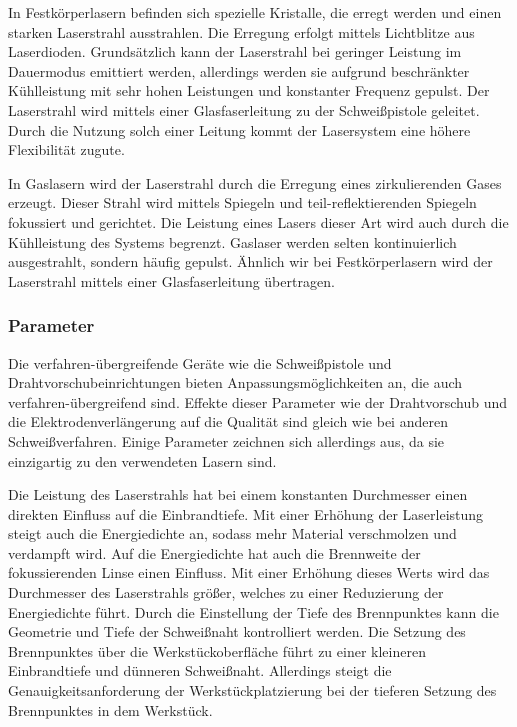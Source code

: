 In Festkörperlasern befinden sich spezielle Kristalle, die erregt werden und einen starken Laserstrahl ausstrahlen. Die Erregung erfolgt mittels Lichtblitze aus Laserdioden. Grundsätzlich kann der Laserstrahl bei geringer Leistung im Dauermodus emittiert werden, allerdings werden sie aufgrund beschränkter Kühlleistung mit sehr hohen Leistungen und konstanter Frequenz gepulst. Der Laserstrahl wird mittels einer Glasfaserleitung zu der Schweißpistole geleitet. Durch die Nutzung solch einer Leitung kommt der Lasersystem eine höhere Flexibilität zugute. \autocite[47-48]{Pires_WeldingRobots_2006}

In Gaslasern wird der Laserstrahl durch die Erregung eines zirkulierenden Gases erzeugt. Dieser Strahl wird mittels Spiegeln und teil-reflektierenden Spiegeln fokussiert und gerichtet. Die Leistung eines Lasers dieser Art wird auch durch die Kühlleistung des Systems begrenzt. Gaslaser werden selten kontinuierlich ausgestrahlt, sondern häufig gepulst. Ähnlich wir bei Festkörperlasern wird der Laserstrahl mittels einer Glasfaserleitung übertragen. \autocite[48-49]{Pires_WeldingRobots_2006}

\subsubsection{Parameter}
Die verfahren-übergreifende Geräte wie die Schweißpistole und Drahtvorschubeinrichtungen bieten Anpassungsmöglichkeiten an, die auch verfahren-übergreifend sind. Effekte dieser Parameter wie der Drahtvorschub und die Elektrodenverlängerung auf die Qualität sind gleich wie bei anderen Schweißverfahren. Einige Parameter zeichnen sich allerdings aus, da sie einzigartig zu den verwendeten Lasern sind. 

Die Leistung des Laserstrahls hat bei einem konstanten Durchmesser einen direkten Einfluss auf die Einbrandtiefe. Mit einer Erhöhung der Laserleistung steigt auch die Energiedichte an, sodass mehr Material verschmolzen und verdampft wird. Auf die Energiedichte hat auch die Brennweite der fokussierenden Linse einen Einfluss. Mit einer Erhöhung dieses Werts wird das Durchmesser des Laserstrahls größer, welches zu einer Reduzierung der Energiedichte führt. Durch die Einstellung der Tiefe des Brennpunktes kann die Geometrie und Tiefe der Schweißnaht kontrolliert werden. Die Setzung des Brennpunktes über die Werkstückoberfläche führt zu einer kleineren Einbrandtiefe und dünneren Schweißnaht. Allerdings steigt die Genauigkeitsanforderung der Werkstückplatzierung bei der tieferen Setzung des Brennpunktes in dem Werkstück. \autocite[50]{Pires_WeldingRobots_2006}

